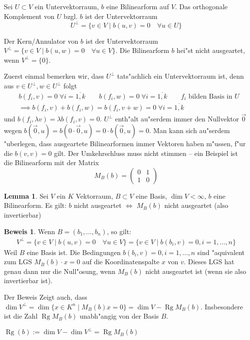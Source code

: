 \documentclass[oneside,fontsize=11pt,paper=a4,BCOR=0mm,DIV=12,automark,headsepline]{scrbook}
\DeclareMathOperator{\mRg}{Rg}
\theoremstyle{remark}
\theoremstyle{definition}
\newtheorem{lemma}{Lemma}[section]
\theoremstyle{definition}
\newtheorem*{prof}{Beweis}
\theoremstyle{remark}
\begin{document}
\begin{definition}{}{}
  Sei $U\subset V$ ein Untervektorraum, $b$ eine Bilinearform auf $V$. Das
  orthogonale Komplement von $U$ bzgl. $b$ ist der Untervektorraum \[U^\perp = \{v\in V\mid b(u, v) = 0\quad \forall u \in U\}\]

  Der Kern/Annulator von $b$ ist der Untervektorraum $V^\perp = \{v\in V \mid b(u, w) = 0 \quad \forall u\in V\}$. Die Bilinearform $b$ hei"st nicht ausgeartet, wenn \(V^\perp = \{0\}\).
\end{definition}
\begin{comm}
  Zuerst einmal bemerken wir, dass \(U^\perp\) tats"achlich ein Untervektorraum ist, denn aus \(v\in U^\perp, w\in U^\perp\) folgt
  \begin{align*}
    &b(f_i, v) = 0\;\forall i=\overline{1,k}\qquad b(f_i, w) = 0\;\forall i=\overline{1,k}\qquad f_i\text{ bilden Basis in }U \\
    &\implies b(f_i, v) + b(f_i, w) = b(f_i, v+ w) = 0\;\forall i=\overline{1, k}
  \end{align*}
  und \(b(f_i, \lambda v) = \lambda b(f_i, v) = 0\). \(U^\perp\) enth"alt au"serdem immer den Nullvektor \(\vec{0}\) wegen \(b(\vec{0}, u) = b(0\cdot \vec{0}, u) = 0\cdot b(\vec{0}, u) = 0\). Man kann sich au"serdem "uberlegen, dass ausgeartete Bilinearformen immer Vektoren haben m"ussen, f"ur die \(b(v, v) = 0\) gilt. Der Umkehrschluss muss nicht stimmen -- ein Beispiel ist die Bilinearform mit der Matrix \[M_B(b) = \begin{pmatrix}0 & 1\\ 1& 0\end{pmatrix}\]
\end{comm}
\begin{lemma}
  Sei $V$ ein $K$ Vektorraum, $B\subset V$ eine Basis, $\dim V < \infty$, $b$
  eine Bilinearform. Es gilt: $b$ nicht ausgeartet $\iff$ $M_B(b)$ nicht
  ausgeartet (also invertierbar)
\end{lemma}

\begin{prof}
  Wenn \(B = (b_1, \dots, b_n)\), so gilt:
  \begin{align*}
    V^\perp = \{v \in V \mid b(u, v) = 0\quad \forall u \in V\} = \{ v\in V \mid b(b_i, v) = 0, i = 1,\dots, n\}
  \end{align*}
  Weil \(B\) eine Basis ist.
  Die Bedingungen \(b(b_i, v) = 0, i = 1,\dots, n\) sind "aquivalent zum LGS $M_B(b) \cdot x = 0 $  auf die
  Koordinatenspalte $x$ von $v$. Dieses LGS hat genau dann nur die Null"osung,
  wenn $M_B(b)$ nicht ausgeartet ist (wenn sie also invertierbar ist).
\end{prof}
Der Beweis Zeigt auch, dass $\dim V^\perp = \dim
  \{x\in K^n\mid  M_B(b)x= 0\} = \dim V - \mRg M_B(b)$. Insbesondere ist die Zahl $\mRg M_B(b)$
  unabh"angig von der Basis $B$.
\begin{definition}{}{}
  \(\mRg(b):=\dim V - \dim V^\perp = \mRg M_B(b)\)
\end{definition}
\end{document}
